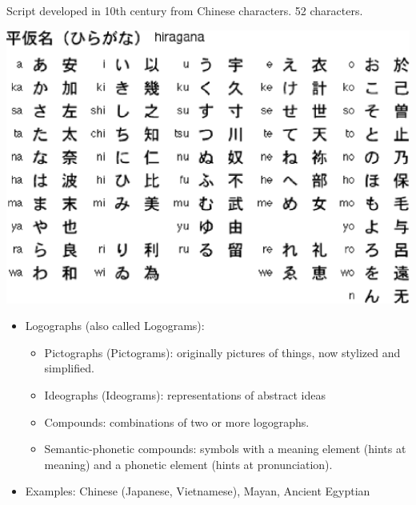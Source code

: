 \documentclass[a4paper,landscape,headrule,footrule,xetex]{foils}
\begin{document}
Script developed in 10th century from Chinese characters. 52 characters.

\begin{center}
  \includegraphics{../pics/hiragana.eps}
\end{center}
\begin{itemize}
\item Logographs (also called Logograms):
\begin{itemize}
\item Pictographs (Pictograms): originally pictures of things, now stylized and simplified.
\item Ideographs (Ideograms): representations of abstract ideas
\item Compounds: combinations of two or more logographs.
\item Semantic-phonetic compounds: symbols with a meaning element (hints at meaning) and a phonetic element (hints at pronunciation).
\end{itemize}

\item Examples: Chinese (Japanese, Vietnamese), Mayan, Ancient Egyptian
\end{itemize}

\end{document}

